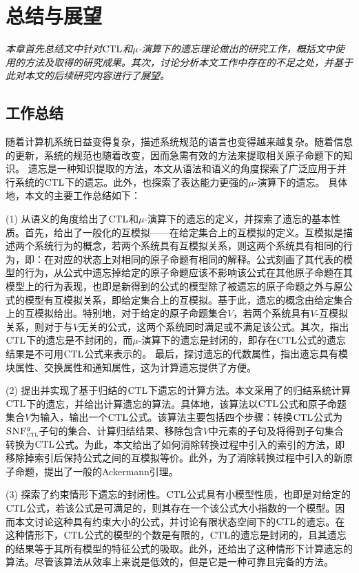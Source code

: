 \chapter{总结与展望}\label{chapter09}
{\em 本章首先总结文中针对$\textrm{CTL}$和$\mu$-演算下的遗忘理论做出的研究工作，概括文中使用的方法及取得的研究成果。其次，讨论分析本文工作中存在的不足之处，并基于此对本文的后续研究内容进行了展望。}

\section{工作总结}
随着计算机系统日益变得复杂，描述系统规范的语言也变得越来越复杂。随着信息的更新，系统的规范也随着改变，因而急需有效的方法来提取相关原子命题下的知识。
遗忘是一种知识提取的方法，本文从语法和语义的角度探索了广泛应用于并行系统的$\textrm{CTL}$下的遗忘。此外，也探索了表达能力更强的$\mu$-演算下的遗忘。
具体地，本文的主要工作总结如下：

(1) 从语义的角度给出了$\textrm{CTL}$和$\mu$-演算下的遗忘的定义，并探索了遗忘的基本性质。首先，给出了一般化的互模拟——在给定集合上的互模拟的定义。互模拟是描述两个系统行为的概念，若两个系统具有互模拟关系，则这两个系统具有相同的行为，即：在对应的状态上对相同的原子命题有相同的解释。公式刻画了其代表的模型的行为，从公式中遗忘掉给定的原子命题应该不影响该公式在其他原子命题在其模型上的行为表现，也即是新得到的公式的模型除了被遗忘的原子命题之外与原公式的模型有互模拟关系，即给定集合上的互模拟。基于此，遗忘的概念由给定集合上的互模拟给出。特别地，对于给定的原子命题集合$V$，若两个系统具有$V$-互模拟关系，则对于与$V$无关的公式，这两个系统同时满足或不满足该公式。其次，指出$\textrm{CTL}$下的遗忘是不封闭的，而$\mu$-演算下的遗忘是封闭的，即存在$\textrm{CTL}$公式的遗忘结果是不可用$\textrm{CTL}$公式来表示的。
最后，探讨遗忘的代数属性，指出遗忘具有模块属性、交换属性和通知属性，这为计算遗忘提供了方便。

(2) 提出并实现了基于归结的$\textrm{CTL}$下遗忘的计算方法。本文采用了\citeauthor{zhang2014resolution}的归结系统计算$\textrm{CTL}$下的遗忘，并给出计算遗忘的算法。具体地，该算法以$\textrm{CTL}$公式和原子命题集合$V$为输入，输出一个$\textrm{CTL}$公式。该算法主要包括四个步骤：转换$\textrm{CTL}$公式为${\textsc{SNF}_{\textsc{ctl}}^g}$子句的集合、计算归结结果、移除包含$V$中元素的子句及将得到子句集合转换为$\textrm{CTL}$公式。为此，本文给出了如何消除转换过程中引入的索引的方法，即移除掉索引后保持公式之间的互模拟等价。此外，为了消除转换过程中引入的新原子命题，提出了一般的Ackermann引理。

(3) 探索了约束情形下遗忘的封闭性。$\textrm{CTL}$公式具有小模型性质，也即是对给定的$\textrm{CTL}$公式，若该公式是可满足的，则其存在一个该公式大小指数的一个模型。因而本文讨论这种具有约束大小的公式，并讨论有限状态空间下的$\textrm{CTL}$的遗忘。在这种情形下，$\textrm{CTL}$公式的模型的个数是有限的，$\textrm{CTL}$的遗忘是封闭的，且其遗忘的结果等于其所有模型的特征公式的吸取。此外，还给出了这种情形下计算遗忘的算法。尽管该算法从效率上来说是低效的，但是它是一种可靠且完备的方法。

